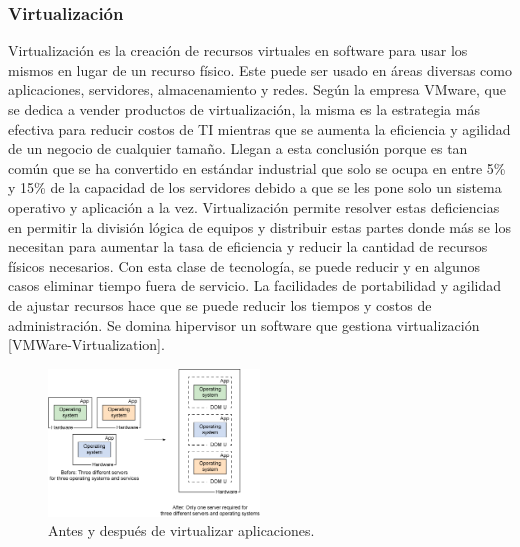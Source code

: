 \subsubsection{Virtualización}
Virtualización es la creación de recursos virtuales en software para usar los mismos en lugar de un recurso físico. Este puede ser usado en áreas diversas como aplicaciones, servidores, almacenamiento y redes. Según la empresa VMware, que se dedica a vender productos de virtualización, la misma es la estrategia más efectiva para reducir costos de TI mientras que se aumenta la eficiencia y agilidad de un negocio de cualquier tamaño. Llegan a esta conclusión porque es tan común que se ha convertido en estándar industrial que solo se ocupa en entre 5\% y 15\% de la capacidad de los servidores debido a que se les pone solo un sistema operativo y aplicación a la vez. Virtualización permite resolver estas deficiencias en permitir la división lógica de equipos y distribuir estas partes donde más se los necesitan para aumentar la tasa de eficiencia y reducir la cantidad de recursos físicos necesarios. Con esta clase de tecnología, se puede reducir y en algunos casos eliminar tiempo fuera de servicio. La facilidades de portabilidad y agilidad de ajustar recursos hace que se puede reducir los tiempos y costos de administración. Se domina hipervisor un software que gestiona virtualización [VMWare-Virtualization].

\begin{figure}
  \begin{center}
      \includegraphics[width=0.5\textwidth]{Figures/ibm-virtualization.png}
  \end{center}
  \caption{Antes y después de virtualizar aplicaciones.} 
  \label{IBM-Virtualization}
\end{figure}


